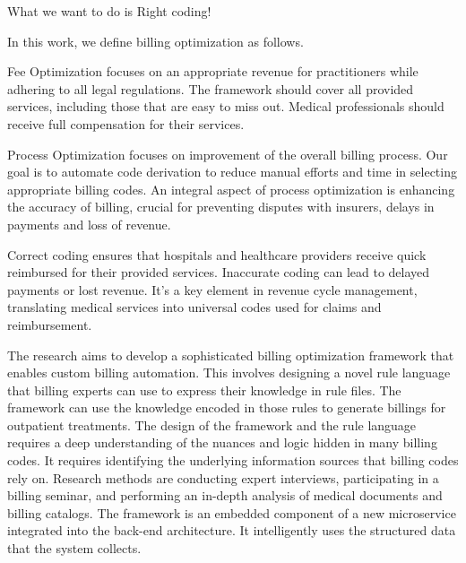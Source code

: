 What we want to do is Right coding!


In this work, we define billing optimization as follows.
\begin{description}
    \item Fee Optimization focuses on an appropriate revenue for practitioners while adhering to all legal regulations.
    The framework should cover all provided services, including those that are easy to miss out.
    Medical professionals should receive full compensation for their services.
    \item Process Optimization focuses on improvement of the overall billing process.
    Our goal is to automate code derivation to reduce manual efforts and time in selecting appropriate billing codes.
    An integral aspect of process optimization is enhancing the accuracy of billing, crucial for preventing disputes with insurers, delays in payments and loss of revenue.
\end{description}
Correct coding ensures that hospitals and healthcare providers receive quick reimbursed for their provided services.
Inaccurate coding can lead to delayed payments or lost revenue.
It's a key element in revenue cycle management, translating medical services into universal codes used for claims and reimbursement.

The research aims to develop a sophisticated billing optimization framework that enables custom billing automation.
This involves designing a novel rule language that billing experts can use to express their knowledge in rule files.
The framework can use the knowledge encoded in those rules to generate billings for outpatient treatments.
The design of the framework and the rule language requires a deep understanding of the nuances and logic hidden in many billing codes.
It requires identifying the underlying information sources that billing codes rely on.
Research methods are conducting expert interviews, participating in a billing seminar, and performing an in-depth analysis of medical documents and billing catalogs.
The framework is an embedded component of a new microservice integrated into the \AV back-end architecture.
It intelligently uses the structured data that the \AV system collects.

